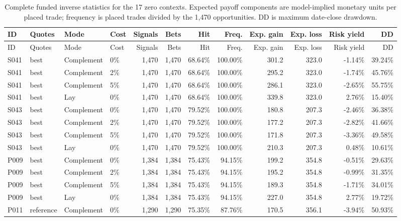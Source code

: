 \begin{longtable}{llllrrrrrrrr}
\caption{Complete funded inverse statistics for the 17 zero contexts. Expected payoff components are model-implied monetary units per placed trade; frequency is placed trades divided by the 1,470 opportunities. DD is maximum date-close drawdown.}\label{tab:all_inverse_metrics}\\
\toprule
ID & Quotes & Mode & Cost & Signals & Bets & Hit & Freq. & Exp. gain & Exp. loss & Risk yield & DD \\ \midrule
\endfirsthead
\toprule
ID & Quotes & Mode & Cost & Signals & Bets & Hit & Freq. & Exp. gain & Exp. loss & Risk yield & DD \\ \midrule
\endhead
\bottomrule
\endfoot
S041 & best & Complement & 0\% & 1,470 & 1,470 & 68.64\% & 100.00\% & 301.2 & 323.0 & -1.14\% & 39.24\% \\
S041 & best & Complement & 2\% & 1,470 & 1,470 & 68.64\% & 100.00\% & 295.2 & 323.0 & -1.74\% & 45.76\% \\
S041 & best & Complement & 5\% & 1,470 & 1,470 & 68.64\% & 100.00\% & 286.1 & 323.0 & -2.65\% & 55.75\% \\
S041 & best & Lay & 0\% & 1,470 & 1,470 & 68.64\% & 100.00\% & 339.8 & 323.0 & 2.76\% & 15.40\% \\
S043 & best & Complement & 0\% & 1,470 & 1,470 & 79.52\% & 100.00\% & 180.8 & 207.3 & -2.46\% & 36.38\% \\
S043 & best & Complement & 2\% & 1,470 & 1,470 & 79.52\% & 100.00\% & 177.2 & 207.3 & -2.82\% & 41.66\% \\
S043 & best & Complement & 5\% & 1,470 & 1,470 & 79.52\% & 100.00\% & 171.8 & 207.3 & -3.36\% & 49.58\% \\
S043 & best & Lay & 0\% & 1,470 & 1,470 & 79.52\% & 100.00\% & 210.3 & 207.3 & 0.48\% & 10.61\% \\
P009 & best & Complement & 0\% & 1,384 & 1,384 & 75.43\% & 94.15\% & 199.2 & 354.8 & -0.51\% & 29.63\% \\
P009 & best & Complement & 2\% & 1,384 & 1,384 & 75.43\% & 94.15\% & 195.2 & 354.8 & -0.99\% & 31.35\% \\
P009 & best & Complement & 5\% & 1,384 & 1,384 & 75.43\% & 94.15\% & 189.3 & 354.8 & -1.71\% & 34.01\% \\
P009 & best & Lay & 0\% & 1,384 & 1,384 & 75.43\% & 94.15\% & 227.0 & 354.8 & 2.77\% & 19.72\% \\
P011 & reference & Complement & 0\% & 1,290 & 1,290 & 75.35\% & 87.76\% & 170.5 & 356.1 & -3.94\% & 50.93\% \\

\end{longtable}
